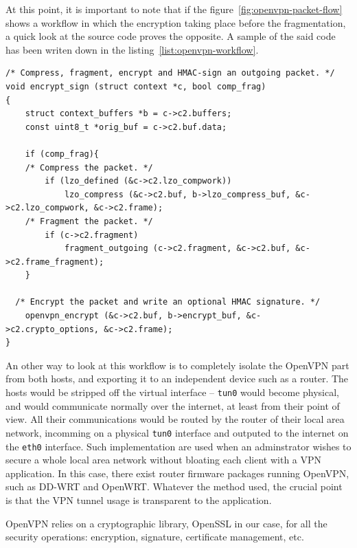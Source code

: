 \noindent At this point, it is important to note that if the figure~\ref{fig:openvpn-packet-flow} shows a workflow in which the encryption taking place before the fragmentation, a quick look at the source code proves the opposite.
A sample of the said code has been writen down in the listing~\ref{list:openvpn-workflow}.


\lstset{language=c}
\begin{lstlisting}[caption={openvpn compress then encrypt -- sample from \texttt{forward.c}. It clearly shows that the order of operations in the packet workflow is compression, then fragmentation and finally encryption.}, label=list:openvpn-workflow, float]% The 'float' option makes the listing unbreakable.
/* Compress, fragment, encrypt and HMAC-sign an outgoing packet. */
void encrypt_sign (struct context *c, bool comp_frag)
{
	struct context_buffers *b = c->c2.buffers;
	const uint8_t *orig_buf = c->c2.buf.data;

	if (comp_frag){
	/* Compress the packet. */
		if (lzo_defined (&c->c2.lzo_compwork))
			lzo_compress (&c->c2.buf, b->lzo_compress_buf, &c->c2.lzo_compwork, &c->c2.frame);
	/* Fragment the packet. */
		if (c->c2.fragment)
			fragment_outgoing (c->c2.fragment, &c->c2.buf, &c->c2.frame_fragment);
	}

  /* Encrypt the packet and write an optional HMAC signature. */
	openvpn_encrypt (&c->c2.buf, b->encrypt_buf, &c->c2.crypto_options, &c->c2.frame);
}
\end{lstlisting}

An other way to look at this workflow is to completely isolate the OpenVPN part from both hosts, and exporting it to an independent device such as a router.
The hosts would be stripped off the virtual interface -- \texttt{tun0} would become physical, and would communicate normally over the internet, at least from their point of view.
All their communications would be routed by the router of their local area network, incomming on a physical \texttt{tun0} interface and outputed to the internet on the \texttt{eth0} interface.
Such implementation are used when an adminstrator wishes to secure a whole local area network without bloating each client with a VPN application.
In this case, there exist router firmware packages running OpenVPN, such as DD-WRT and OpenWRT.
Whatever the method used, the crucial point is that the VPN tunnel usage is transparent to the application.\newline{}

OpenVPN relies on a cryptographic library, OpenSSL in our case, for all the security operations: encryption, signature, certificate management, etc.

